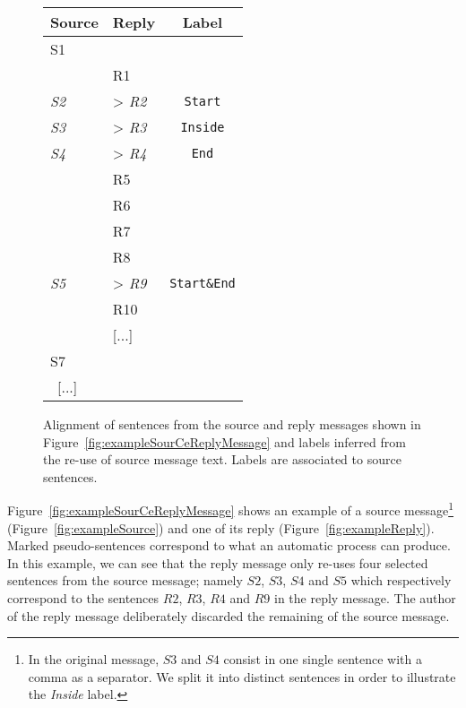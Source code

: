 \begin{figure}[ht!]\small\centering
\begin{tabular}{*{2}{|l}|c|}
\toprule
\textbf{Source} & \textbf{Reply} & \textbf{Label}\\
	\midrule
S1  & & \\
    & R1 & \\
\textit{S2}  & > \textit{R2}& \texttt{Start}\\
\textit{S3}  & > \textit{R3}& \texttt{Inside}\\
\textit{S4}  & > \textit{R4}& \texttt{End}\\
    & R5 & \\
    & R6 & \\
    & R7 & \\
    & R8 & \\
\textit{S5}  & > \textit{R9} & \texttt{Start\&End}\\
    & R10 & \\
    & [...] & \\
S7    &  & \\ \ 
[...] \    &  & \\
	\bottomrule
\end{tabular}

\caption{Alignment of sentences from the source and reply messages shown in Figure~\ref{fig:exampleSourCeReplyMessage} and labels inferred from the re-use of source message text. Labels are associated to source sentences.}
\label{fig:exampleSegmentationLabels}
\end{figure}


Figure~\ref{fig:exampleSourCeReplyMessage} shows an example of a source message\footnote{In the original message, $S3$ and $S4$ consist in one single sentence with a comma as a separator. We split it into distinct sentences in order to illustrate the \textit{Inside} label.} (Figure~\ref{fig:exampleSource}) and one of its reply (Figure~\ref{fig:exampleReply}).
Marked pseudo-sentences correspond to what an automatic process can produce. 
In this example, we can see that the reply message only re-uses four selected sentences from the source message; namely $S2$, $S3$, $S4$ and $S5$ which respectively correspond to the sentences  $R2$, $R3$, $R4$ and $R9$ in the reply message.
The author of the reply message deliberately discarded the remaining of the source message.

